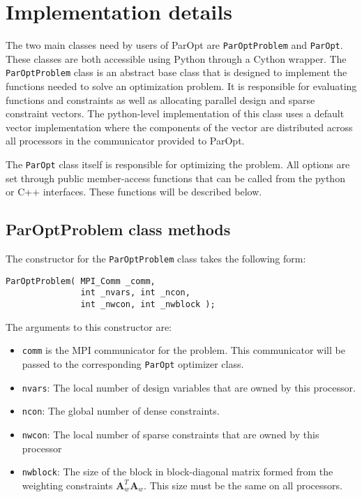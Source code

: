 \documentclass[12pt]{article}
\newcommand{\mb}{\mathbf}
\begin{document}
\section{Implementation details}

The two main classes need by users of ParOpt are \texttt{ParOptProblem} and \texttt{ParOpt}.
These classes are both accessible using Python through a Cython wrapper.
The \texttt{ParOptProblem} class is an abstract base class that is designed to implement the functions needed to solve an optimization problem.
It is responsible for evaluating functions and constraints as well as allocating parallel design and sparse constraint vectors.
The python-level implementation of this class uses a default vector implementation where the components of the vector are distributed across all processors in the communicator provided to ParOpt.

The \texttt{ParOpt} class itself is responsible for optimizing the problem.
All options are set through public member-access functions that can be called from the python or C++ interfaces.
These functions will be described below.

\subsection{ParOptProblem class methods}

The constructor for the \texttt{ParOptProblem} class takes the following form:
%
\begin{verbatim}
ParOptProblem( MPI_Comm _comm,
               int _nvars, int _ncon,
               int _nwcon, int _nwblock );
\end{verbatim}

The arguments to this constructor are:
\begin{itemize}
\item \texttt{comm} is the MPI communicator for the problem.
This communicator will be passed to the corresponding \texttt{ParOpt} optimizer class.

\item \texttt{nvars}: The local number of design variables that are owned by this processor.

\item \texttt{ncon}: The global number of dense constraints.

\item \texttt{nwcon}: The local number of sparse constraints that are owned by this processor

\item \texttt{nwblock}: The size of the block in block-diagonal matrix formed from the weighting constraints $\mb{A}_{w}^{T}\mb{A}_{w}$. This size must be the same on all processors.
\end{itemize}
\end{document}
